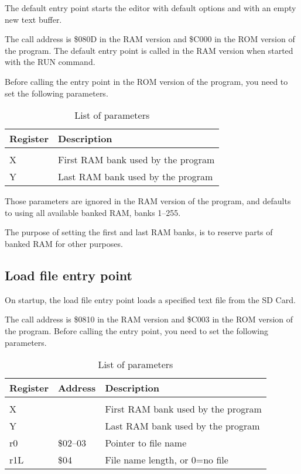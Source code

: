 \documentclass{article}
\begin{document}
        The default entry point starts the editor with default options and with an
        empty new text buffer.

        The call address is \$080D in the RAM version and \$C000
        in the ROM version of the program. The default entry point is called in
        the RAM version when started with the RUN command.

        Before calling the entry point in the ROM version of the program, you need to set the following
        parameters.

        \begin{longtable}{l l}
            \caption{List of parameters} \\
	        \textbf{Register} & \textbf{Description} \\
	        \hline \\
            X  & First RAM bank used by the program \\
            Y  & Last RAM bank used by the program \\
        \end{longtable}

        \noindent Those parameters are ignored in the RAM version of the program, and
        defaults to using all available banked RAM, banks 1--255.

        The purpose of setting the first and last RAM banks, is to reserve parts of banked RAM
        for other purposes.

    \subsection{Load file entry point}

        On startup, the load file entry point loads a specified text file from the SD Card.

        The call address is \$0810 in the RAM version and \$C003 in the ROM version of the program.
        Before calling the entry point, you need to set the following parameters.

        \begin{longtable}{l l l}
            \caption{List of parameters} \\
	        \textbf{Register} & \textbf{Address} & \textbf{Description} \\
	        \hline \\
            X   &          & First RAM bank used by the program \\
            Y   &          & Last RAM bank used by the program \\
            r0  & \$02--03 & Pointer to file name \\
            r1L & \$04     & File name length, or 0=no file \\
        \end{longtable}
\end{document}
